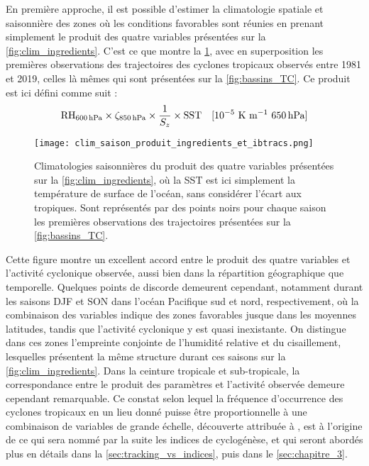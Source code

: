 \documentclass[../main.tex]{subfiles}
\begin{document}
En première approche, il est possible d'estimer la climatologie spatiale et saisonnière des zones où les conditions favorables sont réunies en prenant simplement le produit des quatre variables présentées sur la \cref{fig:clim_ingredients}. C'est ce que montre la \cref{fig:produit_ingredients}, avec en superposition les premières observations des trajectoires des cyclones tropicaux observés entre 1981 et 2019, celles là mêmes qui sont présentées sur la \cref{fig:bassins_TC}. Ce produit est
ici défini comme suit :
\begin{equation*}
    \text{RH}_{\SI{600}{\hecto\pascal}} \times \zeta_{\SI{850}{\hecto\pascal}} \times \frac{1}{S_z} \times \text{SST} \quad \text{[$10^{-5}$ K m$^{-1}$ \SI{650}{\hecto\pascal}}]
\end{equation*}
\begin{figure}[tbp]
    \centering
    \texttt{[image: clim\_saison\_produit\_ingredients\_et\_ibtracs.png]}
    \caption{Climatologies saisonnières du produit des quatre variables présentées sur la \cref{fig:clim_ingredients}, où la SST est ici simplement la température de surface de l'océan, sans considérer l'écart aux tropiques.
    Sont représentés par des points noirs pour chaque saison les premières observations des trajectoires présentées sur la \cref{fig:bassins_TC}.}
    \label{fig:produit_ingredients}
\end{figure}
\noindent Cette figure montre un excellent accord entre le produit des quatre variables et l'activité cyclonique observée, aussi bien dans la répartition géographique que temporelle. Quelques points de discorde demeurent cependant, notamment durant les saisons DJF et SON dans l'océan Pacifique sud et nord, respectivement, où la combinaison des variables indique des zones favorables jusque dans les moyennes latitudes, tandis que l'activité cyclonique y est quasi inexistante.
On distingue dans ces zones l'empreinte conjointe de l'humidité relative et du cisaillement, lesquelles présentent la même structure durant ces saisons sur la \cref{fig:clim_ingredients}. Dans la ceinture tropicale et sub-tropicale, la correspondance entre le produit des paramètres et l'activité observée demeure cependant remarquable. Ce constat selon lequel la fréquence d'occurrence des cyclones tropicaux en un lieu donné puisse être proportionnelle à une combinaison de variables de grande échelle, découverte attribuée à \cite{gray_tropical_1975}, est à l'origine de ce qui sera nommé par la suite les indices de
cyclogénèse, et qui seront abordés plus en détails dans la \cref{sec:tracking_vs_indices}, puis dans le \cref{sec:chapitre_3}.
\end{document}
